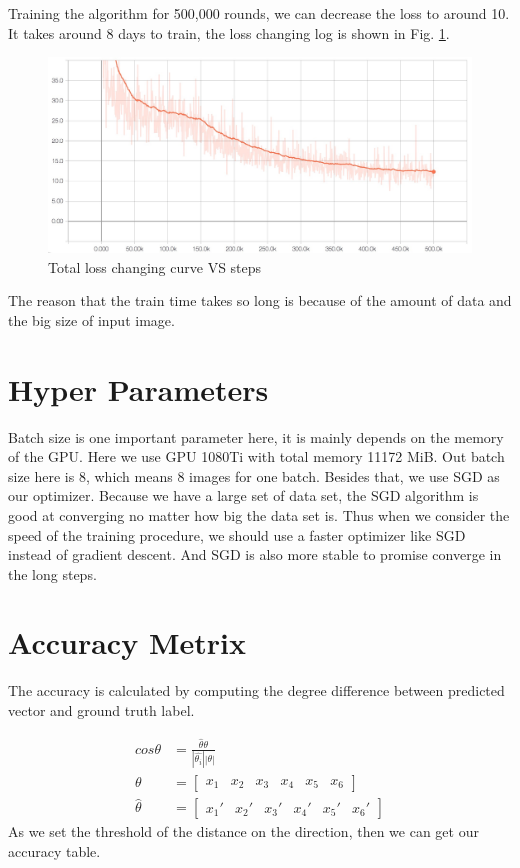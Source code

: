 \documentclass[senior]{IPSstyle}
\begin{document}
Training the algorithm for 500,000 rounds, we can decrease the loss to around 10.
It takes around 8 days to train, the loss changing log is shown in Fig. \ref{fig:loss}.
\begin{figure}
    \centering
    \includegraphics[width=15cm]{MasterThesis-master/images/loss.jpg}
    \caption{Total loss changing curve VS steps}
    \label{fig:loss}
\end{figure}
The reason that the train time takes so long is because of the amount of data and the big size of input image.


\section{Hyper Parameters}
Batch size is one important parameter here, it is mainly depends on the memory of the GPU.
Here we use GPU 1080Ti with total memory 11172 MiB.
Out batch size here is 8, which means 8 images for one batch.
Besides that, we use SGD as our optimizer\cite{bottou2010large}.
Because we have a large set of data set, the SGD algorithm is good at converging no matter how big the data set is.
Thus when we consider the speed of the training procedure, we should use a faster optimizer like SGD instead of gradient descent.
And SGD is also more stable to promise converge in the long steps.

\section{Accuracy Metrix}
The accuracy is calculated by computing the degree difference between predicted vector and ground truth label.

\begin{equation}\label{accuracy}
\begin{split}
    cos\theta & = \frac{\hat{\theta}\theta}{|\hat{\theta_i}||\theta|} \\
        \theta      & = \begin{bmatrix} x_1 &x_2 &x_3 & x_4 &x_5 &x_6 \end{bmatrix}  \\
        \hat{\theta} & = \begin{bmatrix} {x_1}' &{x_2}' &{x_3}' & {x_4}' &{x_5}' &{x_6}' \end{bmatrix} 
\end{split}
\end{equation}
As we set the threshold of the distance on the direction, then we can get our accuracy table.
\end{document}
